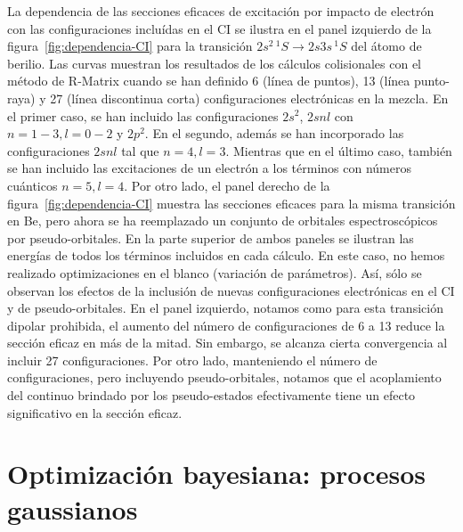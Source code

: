 La dependencia de las secciones eficaces de excitación por impacto de 
electrón con las configuraciones incluídas en el CI se ilustra en el 
panel izquierdo de la figura~\ref{fig:dependencia-CI} para la transición 
$2s^2\,^1S\rightarrow 2s3s\,^1S$ del átomo de berilio. Las curvas 
muestran los resultados de los cálculos colisionales con el método de 
R-Matrix cuando se han definido 6 (línea de puntos), 13 (línea 
punto-raya) y 27 (línea discontinua corta) configuraciones electrónicas 
en la mezcla. En el primer caso, se han incluido las configuraciones 
$2s^2$, $2snl$ con $n=1-3,l=0-2$ y $2p^2$. En el segundo, además se han 
incorporado las configuraciones $2snl$ tal que $n=4,l=3$. Mientras que en 
el último caso, también se han incluido las excitaciones de un electrón a 
los términos con números cuánticos $n=5,l=4$. Por otro lado, el panel 
derecho de la figura~\ref{fig:dependencia-CI} muestra las secciones 
eficaces para la misma transición en Be, pero ahora se ha reemplazado un 
conjunto de orbitales espectroscópicos por pseudo-orbitales. En la parte 
superior de ambos paneles se ilustran las energías de todos los términos 
incluidos en cada cálculo. En este caso, no hemos realizado 
optimizaciones en el blanco (variación de parámetros). Así, sólo se 
observan los efectos de la inclusión de nuevas configuraciones 
electrónicas en el CI y de pseudo-orbitales. En el panel izquierdo, 
notamos como para esta transición dipolar prohibida, el aumento del 
número de configuraciones de 6 a 13 reduce la sección eficaz en más de la 
mitad. Sin embargo, se alcanza cierta convergencia al incluir 27 
configuraciones. Por otro lado, manteniendo el número de configuraciones,
pero incluyendo pseudo-orbitales, notamos que el acoplamiento del 
continuo brindado por los pseudo-estados efectivamente tiene un efecto 
significativo en la sección eficaz.


\section{Optimización bayesiana: procesos gaussianos}
\label{sec:gaussianprocess}

